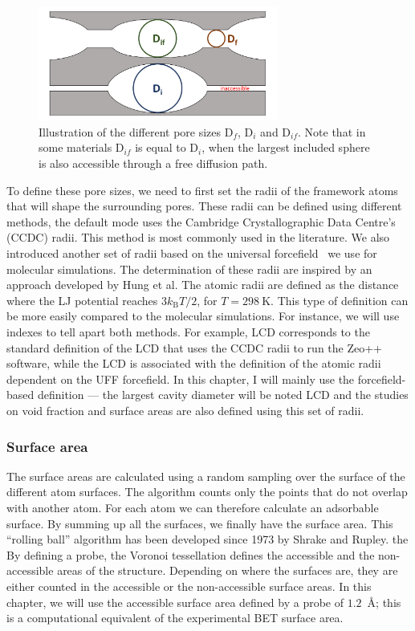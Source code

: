 \documentclass[main.tex]{subfiles}
\begin{document}
\begin{figure}[ht]
  \centering
  \includegraphics[width=0.7\textwidth]{figures/2-thermo/pores.pdf}
  \caption{Illustration of the different pore sizes D$_f$, D$_i$ and D$_{if}$. Note that in some materials D$_{if}$ is equal to D$_i$, when the largest included sphere is also accessible through a free diffusion path. }\label{fgr:pore_size}
\end{figure}

To define these pore sizes, we need to first set the radii of the framework atoms that will shape the surrounding pores. These radii can be defined using different methods, the default mode uses the Cambridge Crystallographic Data Centre's (CCDC) radii. This method is most commonly used in the literature. We also introduced another set of radii based on the universal forcefield~\autocite{rappe1992} we use for molecular simulations. The determination of these radii are inspired by an approach developed by Hung et al.\autocite{Hung_2021} The atomic radii are defined as the distance where the LJ potential reaches $3 k_\text{B} T/2$, for $T = \SI{298}{\kelvin}$. This type of definition can be more easily compared to the molecular simulations. For instance, we will use indexes to tell apart both methods. For example, LCD corresponds to the standard definition of the LCD that uses the CCDC radii to run the Zeo++ software, while the LCD is associated with the definition of the atomic radii dependent on the UFF forcefield. In this chapter, I will mainly use the forcefield-based definition --- the largest cavity diameter will be noted LCD and the studies on void fraction and surface areas are also defined using this set of radii.


\subsubsection{Surface area}

The surface areas are calculated using a random sampling over the surface of the different atom surfaces. The algorithm counts only the points that do not overlap with another atom. For each atom we can therefore calculate an adsorbable surface. By summing up all the surfaces, we finally have the surface area. This ``rolling ball'' algorithm has been developed since 1973 by Shrake and Rupley.\autocite{Shrake1973} the By defining a probe, the Voronoi tessellation defines the accessible and the non-accessible areas of the structure. Depending on where the surfaces are, they are either counted in the accessible or the non-accessible surface areas. In this chapter, we will use the accessible surface area defined by a probe of $1.2$~\si{\angstrom}; this is a computational equivalent of the experimental  BET surface area.
\end{document}

